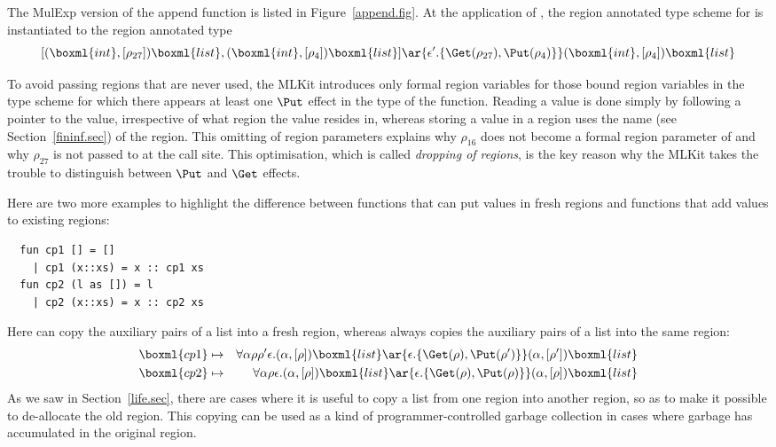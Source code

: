 \documentclass[12pt]{book}
\begin{document}
The MulExp version of the append function is listed in
Figure~\ref{append.fig}. At the application of , the region
annotated type scheme for  is instantiated to the region annotated type
$$[ (\boxml{int},[\rho_{27}])\boxml{list},
      (\boxml{int},[\rho_4])\boxml{list} ]
\ar{\epsilon'.\{\Get(\rho_{27}),\Put(\rho_4)\}} (\boxml{int},[\rho_4])\boxml{list} $$

To avoid passing regions that are never used, the MLKit introduces only
formal region variables for those bound region variables in the type
scheme for which there appears at least one
%
$\Put$ effect in the type of the function.  Reading a value is done
simply by following a pointer to the value, irrespective of what
region the value resides in, whereas storing a value in a region uses
the name (see Section~\ref{fininf.sec}) of the region.  This omitting
of region parameters explains why $\rho_{16}$ does not become a formal
region parameter of  and why $\rho_{27}$ is not passed to
 at the call site. This optimisation, which is called
%
{\em dropping of regions}, is the key reason why the MLKit takes the
trouble to distinguish between $\Put$ and
%
$\Get$ \label{bother-to-distinguish-get-n-put}effects.

Here are two more examples to highlight the difference between
functions that can put values in fresh regions and functions that add
values to existing regions:
\begin{verbatim}
  fun cp1 [] = []
    | cp1 (x::xs) = x :: cp1 xs
  fun cp2 (l as []) = l
    | cp2 (x::xs) = x :: cp2 xs
\end{verbatim}
Here  can copy the auxiliary pairs of a list into a fresh
region, whereas  always copies the auxiliary pairs of a
list into the same region:
\begin{eqnarray*}
\boxml{cp1}&\mapsto&\forall\alpha\rho\rho'\epsilon.
     (\alpha,[\rho])\boxml{list} \ar{\epsilon.\{\Get(\rho),
           \Put(\rho')\}} (\alpha,[\rho'])\boxml{list}\\
\boxml{cp2}&\mapsto&\forall\alpha\rho\epsilon.
     (\alpha,[\rho])\boxml{list} \ar{\epsilon.\{\Get(\rho),
           \Put(\rho)\}} (\alpha,[\rho])\boxml{list}
\end{eqnarray*}
As we saw in Section~\ref{life.sec}, there are cases where it is
useful to copy a list from one region into another region, so as to
make it possible to de-allocate the old region. This copying can be
used as a kind of programmer-controlled garbage collection in cases
where garbage has accumulated in the original region.
\end{document}
